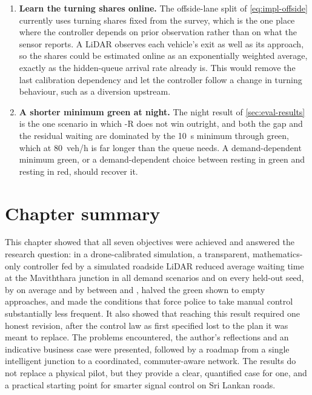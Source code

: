 {\begin{enumerate}[leftmargin=*]
\item \textbf{Learn the turning shares online.} The offside-lane split of \cref{eq:impl-offside} currently uses turning shares fixed from the survey, which is the one place where the controller depends on prior observation rather than on what the sensor reports. A LiDAR observes each vehicle's exit as well as its approach, so the shares could be estimated online as an exponentially weighted average, exactly as the hidden-queue arrival rate already is. This would remove the last calibration dependency and let the controller follow a change in turning behaviour, such as a diversion upstream.
\item \textbf{A shorter minimum green at night.} The night result of \cref{sec:eval-results} is the one scenario in which \prism{}-R does not win outright, and both the  gap and the residual waiting are dominated by the 10~s minimum through green, which at 80~veh/h is far longer than the queue needs. A demand-dependent minimum green, or a demand-dependent choice between resting in green and resting in red, should recover it.
\end{enumerate}}

\section{Chapter summary}

This chapter showed that all seven objectives were achieved and answered the research question: in a drone-calibrated simulation, a transparent, mathematics-only controller fed by a simulated roadside LiDAR reduced average waiting time at the Maviththara junction in all  demand scenarios and on every held-out seed, by  on average and by between  and , halved the green shown to empty approaches, and made the conditions that force police to take manual control substantially less frequent. It also showed that reaching this result required one honest revision, after the control law as first specified lost to the plan it was meant to replace. The problems encountered, the author's reflections and an indicative business case were presented, followed by a roadmap from a single intelligent junction to a coordinated, commuter-aware network. The results do not replace a physical pilot, but they provide a clear, quantified case for one, and a practical starting point for smarter signal control on Sri Lankan roads.
